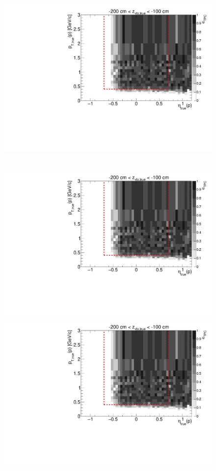 \begin{figure}[hb]
{  \includegraphics[width=\linewidth,page=17]{graphics/eff/Eff2D_TPC_proton_Plus.pdf}
}~
\parbox{0.495\textwidth}{
  \centering
  \includegraphics[width=\linewidth,page=12]{graphics/eff/Eff2D_TPC_proton_Plus.pdf}\\
  \includegraphics[width=\linewidth,page=14]{graphics/eff/Eff2D_TPC_proton_Plus.pdf}\\
}
\end{figure}

